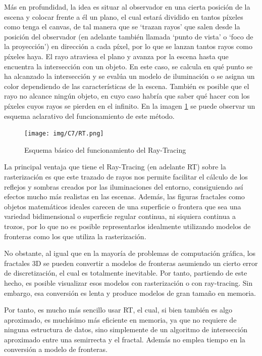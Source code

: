 Más en profundidad, la idea es situar al observador en una cierta posición de la escena y colocar frente a él un plano, el cual estará dividido en tantos píxeles como tenga el canvas, de tal manera que se `trazan rayos' que salen desde la posición del observador (en adelante también llamada `punto de vista' o `foco de la proyección') en dirección a cada píxel, por lo que se lanzan tantos rayos como píxeles haya. El rayo atraviesa el plano y avanza por la escena hasta que encuentra la intersección con un objeto. En este caso, se calcula en qué punto se ha alcanzado la intersección y se evalúa un modelo de iluminación o se asigna un color dependiendo de las características de la escena. También es posible que el rayo no alcance ningún objeto, en cuyo caso habría que saber qué hacer con los píxeles cuyos rayos se pierden en el infinito. En la imagen \ref{fig:RT} se puede observar un esquema aclarativo del funcionamiento de este método.

\begin{figure} [ht]
    \centering
    \texttt{[image: img/C7/RT.png]}
    \caption{Esquema básico del funcionamiento del Ray-Tracing}
    \label{fig:RT}
\end{figure}

La principal ventaja que tiene el Ray-Tracing (en adelante RT) sobre la rasterización es que este trazado de rayos nos permite facilitar el cálculo de los reflejos y sombras creados por las iluminaciones del entorno, consiguiendo así efectos mucho más realistas en las escenas. Además, las figuras fractales como objetos matemáticos ideales carecen de una superficie o frontera que sea una variedad bidimensional o superficie regular continua, ni siquiera continua a trozos, por lo que no es posible representarlos idealmente utilizando modelos de fronteras como los que utiliza la rasterización. 

No obstante, al igual que en la mayoría de problemas de computación gráfica, los fractales 3D se pueden convertir a modelos de fronteras asumiendo un cierto error de discretización, el cual es totalmente inevitable. Por tanto, partiendo de este hecho, es posible visualizar esos modelos con rasterización o con ray-tracing. Sin embargo, esa conversión es lenta y produce modelos de gran tamaño en memoria. 

Por tanto, es mucho más sencillo usar RT, el cual, si bien también es algo aproximado, es muchísimo más eficiente en memoria, ya que no requiere de ninguna estructura de datos, sino simplemente de un algoritmo de intersección aproximado entre una semirrecta y el fractal. Además no emplea tiempo en la conversión a modelo de fronteras. 

